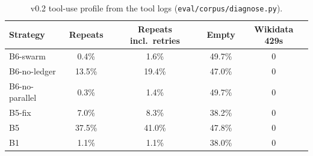 \begin{table}[t]\centering\small
\begin{tabular}{@{}lcccc@{}}
\toprule
Strategy & Repeats & Repeats incl.\ retries & Empty & Wikidata 429s \\
\midrule
B6-swarm & 0.4\% & 1.6\% & 49.7\% & 0 \\
B6-no-ledger & 13.5\% & 19.4\% & 47.0\% & 0 \\
B6-no-parallel & 0.3\% & 1.4\% & 49.7\% & 0 \\
B5-fix & 7.0\% & 8.3\% & 38.2\% & 0 \\
B5 & 37.5\% & 41.0\% & 47.8\% & 0 \\
B1 & 1.1\% & 1.1\% & 38.0\% & 0 \\
\bottomrule
\end{tabular}
\caption{v0.2 tool-use profile from the tool logs (\texttt{eval/corpus/diagnose.py}).}
\label{tab:v02diag}
\end{table}
